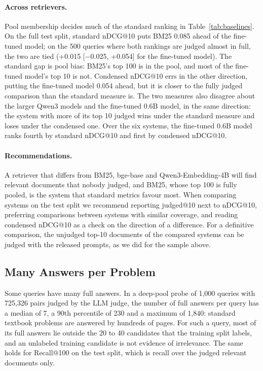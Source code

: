 \paragraph{Across retrievers.} Pool membership decides much of the standard ranking in Table~\ref{tab:baselines}. On the full test split, standard nDCG@10 puts BM25 0.085 ahead of the fine-tuned model; on the 500 queries where both rankings are judged almost in full, the two are tied (+0.015 [$-$0.025, +0.054] for the fine-tuned model). The standard gap is pool bias: BM25's top 100 is in the pool, and most of the fine-tuned model's top 10 is not. Condensed nDCG@10 errs in the other direction, putting the fine-tuned model 0.054 ahead, but it is closer to the fully judged comparison than the standard measure is. The two measures also disagree about the larger Qwen3 models and the fine-tuned 0.6B model, in the same direction: the system with more of its top 10 judged wins under the standard measure and loses under the condensed one. Over the six systems, the fine-tuned 0.6B model ranks fourth by standard nDCG@10 and first by condensed nDCG@10.

\paragraph{Recommendations.} A retriever that differs from BM25, bge-base and Qwen3-Embedding-4B will find relevant documents that nobody judged, and BM25, whose top 100 is fully pooled, is the system that standard metrics favour most. When comparing systems on the test split we recommend reporting judged@10 next to nDCG@10, preferring comparisons between systems with similar coverage, and reading condensed nDCG@10 as a check on the direction of a difference. For a definitive comparison, the unjudged top-10 documents of the compared systems can be judged with the released prompts, as we did for the sample above.

\subsection{Many Answers per Problem}
\label{sec:manyanswers}

Some queries have many full answers. In a deep-pool probe of 1,000 queries with 725,326 pairs judged by the LLM judge, the number of full answers per query has a median of 7, a 90th percentile of 230 and a maximum of 1,840: standard textbook problems are answered by hundreds of pages. For such a query, most of its full answers lie outside the 20 to 40 candidates that the training split labels, and an unlabeled training candidate is not evidence of irrelevance. The same holds for Recall@100 on the test split, which is recall over the judged relevant documents only.

